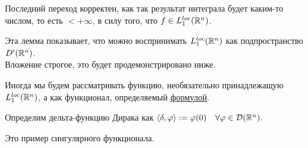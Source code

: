 \begin{remark}
    Последний переход корректен, как так результат интеграла будет каким-то числом, то есть $< +\infty$, в силу того, что $f \in L_1^{loc}(\mathbb{R}^n)$.
\end{remark}

\begin{note}
    Эта лемма показывает, что можно воспринимать $L_1^{loc}(\mathbb{R}^n)$ как подпространство $D'(\mathbb{R}^n)$. \\
    Вложение строгое, это будет продемонстрировано ниже.
\end{note}


\begin{remark}
    Иногда мы будем рассматривать функцию, необязательно принадлежащую $L_1^{loc}(\mathbb{R}^n)$, а как функционал, определяемый \hyperref[lambda_f_functional]{формулой}.
\end{remark}

\begin{definition}
    Определим дельта-функцию Дирака как $\langle \delta, \varphi \rangle := \varphi(0) \quad \forall \varphi \in \mathcal{D}(\mathbb{R}^n).$
\end{definition}

\begin{remark}
    Это пример сингулярного функционала.
\end{remark}

